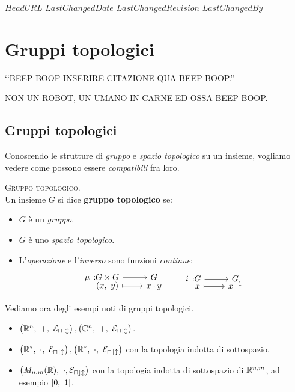 \svnidlong
{$HeadURL$}
{$LastChangedDate$}
{$LastChangedRevision$}
{$LastChangedBy$}

\chapter{Gruppi topologici}

\begin{introduction}
‘‘BEEP BOOP INSERIRE CITAZIONE QUA BEEP BOOP.''
\begin{flushright}
	\textsc{NON UN ROBOT,} UN UMANO IN CARNE ED OSSA BEEP BOOP.
\end{flushright}
\end{introduction}
\section{Gruppi topologici}
Conoscendo le strutture di \textit{gruppo} e \textit{spazio topologico} su un insieme, vogliamo vedere come possono essere \textit{compatibili} fra loro.
\begin{define}\textsc{Gruppo topologico.}\\
	Un insieme $G$ si dice \textbf{gruppo topologico} se:
		\begin{itemize}
			\item $G$ è un \textit{gruppo}.
			\item $G$ è uno \textit{spazio topologico}.
			\item L'\textit{operazione} e l'\textit{inverso} sono funzioni \textit{continue}:
			\begin{equation}
				\funztot \mu {G\times G} G {(x,\ y)} {x\cdot y}\qquad \funztot i G G x {x^{-1}}
			\end{equation}
		\end{itemize}
	\vspace{-3mm}
\end{define}
Vediamo ora degli esempi noti di gruppi topologici.
\begin{examples}
	\begin{itemize}
		\item $\left( \realset^n, \ +, \ \mathcal{E_{ucl}} \right), \left( \complexset ^n, \ +, \ \mathcal{E_{ucl}} \right)$.
		\item $\left( \realset^*, \ \cdot,\ \mathcal{E_{ucl}} \right), \left( \realset^*, \ \cdot, \ \mathcal{E_{ucl}} \right)$ con la topologia indotta di sottospazio.
		\item $\left( M_{n,m}(\mathbb{R}),\ \cdot, \mathcal{E_{ucl}} \right)$ con la topologia indotta di sottospazio di $\mathbb{R}^{n,m}$, ad esempio $\left[0,\ 1\right]$.
	\end{itemize}
\vspace{-3mm}
\end{examples}
